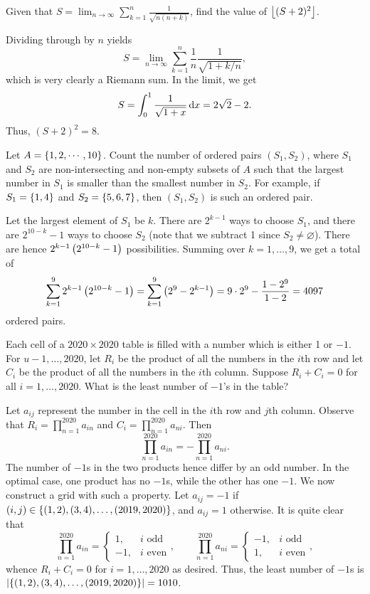 \begin{question}[8]\label{A::2020-O-1-10}
    Given that $S = \displaystyle\lim_{n \to \infty} \sum_{k=1}^n \frac{1}{\sqrt{n(n+k)}}$, find the value of $\left\lfloor (S+2)^2 \right\rfloor$.
\end{question}

Dividing through by $n$ yields \[S = \lim_{n \to \infty} \sum_{k=1}^n \frac1{n} \frac{1}{\sqrt{1 + k/n}},\] which is very clearly a Riemann sum. In the limit, we get \[S = \int_0^1 \frac1{\sqrt{1 + x}} \mathop{\mathrm{d}x} = 2\sqrt2 - 2.\] Thus, $(S + 2)^2 = 8$.

\begin{question}[4097]\label{A::2020-O-1-11}
    Let $A = \left\lbrace 1, 2, \cdots, 10 \right\rbrace$. Count the number of ordered pairs $(S_1, S_2)$, where $S_1$ and $S_2$ are non-intersecting and non-empty subsets of $A$ such that the largest number in $S_1$ is smaller than the smallest number in $S_2$. For example, if $S_1 = \left\lbrace 1, 4 \right\rbrace$ and $S_2 = \left\lbrace 5, 6, 7 \right\rbrace$, then $(S_1, S_2)$ is such an ordered pair.
\end{question}

Let the largest element of $S_1$ be $k$. There are $2^{k-1}$ ways to choose $S_1$, and there are $2^{10-k} - 1$ ways to choose $S_2$ (note that we subtract 1 since $S_2 \neq \varnothing$). There are hence $2^{k-1} \left( 2^{10-k} - 1 \right)$ possibilities. Summing over $k = 1, \ldots, 9$, we get a total of \[\sum_{k=1}^9 2^{k-1} \left( 2^{10-k} - 1 \right) = \sum_{k=1}^9 \left( 2^9 - 2^{k-1} \right) = 9 \cdot 2^9 - \frac{1-2^9}{1-2} = 4097\] ordered pairs.

\begin{question}[1010]\label{A::2020-O-1-12}
    Each cell of a $2020 \times 2020$ table is filled with a number which is either 1 or $-1$. For $u - 1, \ldots, 2020$, let $R_i$ be the product of all the numbers in the $i$th row and let $C_i$ be the product of all the numbers in the $i$th column. Suppose $R_i + C_i = 0$ for all $i = 1, \ldots, 2020$. What is the least number of $-1$'s in the table?
\end{question}

Let $a_{ij}$ represent the number in the cell in the $i$th row and $j$th column. Observe that $R_i = \prod_{n = 1}^{2020} a_{in}$ and $C_i = \prod_{n=1}^{2020} a_{ni}$. Then \[\prod_{n = 1}^{2020} a_{in} = -\prod_{n=1}^{2020} a_{ni}.\] The number of $-1$s in the two products hence differ by an odd number. In the optimal case, one product has no $-1$s, while the other has one $-1$. We now construct a grid with such a property. Let $a_{ij} = -1$ if $(i, j) \in \left\lbrace (1, 2), (3, 4), \ldots, (2019, 2020) \right\rbrace$, and $a_{ij} = 1$ otherwise. It is quite clear that \[\prod_{n = 1}^{2020} a_{in} = \begin{cases}
    1, & i \text{ odd}\\
    -1, & i \text{ even}
\end{cases}, \qquad \prod_{n = 1}^{2020} a_{ni} = \begin{cases}
    -1, & i \text{ odd}\\
    1, & i \text{ even}
\end{cases},\] whence $R_i + C_i = 0$ for $i = 1, \ldots, 2020$ as desired. Thus, the least number of $-1$s is $\left\lvert \left\lbrace (1, 2), (3, 4), \ldots, (2019, 2020) \right\rbrace \right\rvert = 1010$.

